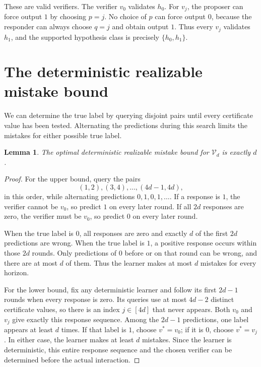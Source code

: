 \documentclass[11pt]{article}
\newcommand{\V}{\mathcal V}
\newtheorem{lemma}[theorem]{Lemma}
\begin{document}
These are valid verifiers. The verifier $v_0$ validates $h_0$. For $v_j$,
the proposer can force output $1$ by choosing $p=j$. No choice of $p$ can
force output $0$, because the responder can always choose $q=j$ and obtain
output $1$. Thus every $v_j$ validates $h_1$, and the supported hypothesis
class is precisely $\{h_0,h_1\}$.

\section{The deterministic realizable mistake bound}\label{sec:clean}

We can determine the true label by querying disjoint pairs until every
certificate value has been tested. Alternating the predictions during this
search limits the mistakes for either possible true label.

\begin{lemma}\label{lem:clean}
The optimal deterministic realizable mistake bound for $\V_d$ is exactly $d$.
\end{lemma}
\begin{proof}
For the upper bound, query the pairs
\[
(1,2),(3,4),\ldots,(4d-1,4d),
\]
in this order, while alternating predictions $0,1,0,1,\ldots$. If a response
is $1$, the verifier cannot be $v_0$, so predict $1$ on every later round.
If all $2d$ responses are zero, the verifier must be $v_0$, so predict $0$
on every later round.

When the true label is $0$, all responses are zero and exactly $d$ of the
first $2d$ predictions are wrong. When the true label is $1$, a positive
response occurs within those $2d$ rounds. Only predictions of $0$ before
or on that round can be wrong, and there are at most $d$ of them. Thus the
learner makes at most $d$ mistakes for every horizon.

For the lower bound, fix any deterministic learner and follow its first
$2d-1$ rounds when every response is zero. Its queries use at most $4d-2$
distinct certificate values, so there is an index $j\in[4d]$ that never
appears. Both $v_0$ and $v_j$ give exactly this response sequence. Among the
$2d-1$ predictions, one label appears at least $d$ times. If that label is
$1$, choose $v^*=v_0$; if it is $0$, choose $v^*=v_j$. In either case, the
learner makes at least $d$ mistakes. Since the learner is deterministic,
this entire response sequence and the chosen verifier can be determined
before the actual interaction.
\end{proof}
\end{document}

